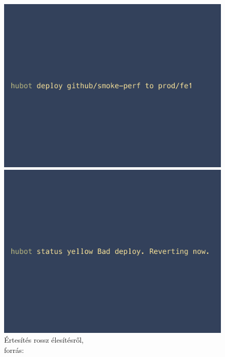 \begin{figure}[H]
  \centering
  \begin{minipage}{.45\textwidth}
    \centering
    \includegraphics[scale=0.90]{assets/hubot_deploy.jpg}%
    \caption[DUMMY]%
    {Élesítés robot segítségével,\\forrás: \cite[p.~40]{what_is_chatops_slideshow}}%
    \label{fig:hubot_deploy}
  \end{minipage}\hfill
  \begin{minipage}{.45\textwidth}
    \centering
    \includegraphics[scale=0.90]{assets/hubot_status.jpg}%
    \caption[DUMMY]%
    {Értesítés rossz élesítésről,\\forrás: \cite[p.~48]{what_is_chatops_slideshow}}%
    \label{fig:hubot_status}
  \end{minipage}\hfill
\end{figure}


